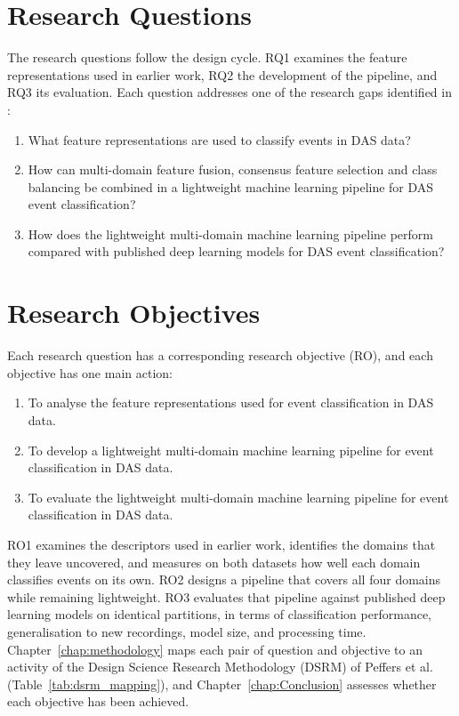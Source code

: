 \section{Research Questions}
\label{sec:ResearchQuestions}
The research questions follow the design cycle. RQ1 examines the feature representations used in earlier work, RQ2 the development of the pipeline, and RQ3 its evaluation. Each question addresses one of the research gaps identified in :
\begin{enumerate}[label=\textbf{RQ\arabic*.}, leftmargin=*, itemsep=4pt]
	\item What feature representations are used to classify events in DAS data?
	\item How can multi-domain feature fusion, consensus feature selection and class balancing be combined in a lightweight machine learning pipeline for DAS event classification?
	\item How does the lightweight multi-domain machine learning pipeline perform compared with published deep learning models for DAS event classification?
\end{enumerate}

\section{Research Objectives}
\label{sec:ResearchObjectives}
Each research question has a corresponding research objective (RO), and each objective has one main action:
\begin{enumerate}[label=\textbf{RO\arabic*.}, leftmargin=*, itemsep=4pt]
	\item To analyse the feature representations used for event classification in DAS data.
	\item To develop a lightweight multi-domain machine learning pipeline for event classification in DAS data.
	\item To evaluate the lightweight multi-domain machine learning pipeline for event classification in DAS data.
\end{enumerate}
RO1 examines the descriptors used in earlier work, identifies the domains that they leave uncovered, and measures on both datasets how well each domain classifies events on its own. RO2 designs a pipeline that covers all four domains while remaining lightweight. RO3 evaluates that pipeline against published deep learning models on identical partitions, in terms of classification performance, generalisation to new recordings, model size, and processing time. Chapter~\ref{chap:methodology} maps each pair of question and objective to an activity of the Design Science Research Methodology (DSRM) of Peffers et al.~\cite{peffers2007dsrm} (Table~\ref{tab:dsrm_mapping}), and Chapter~\ref{chap:Conclusion} assesses whether each objective has been achieved.


